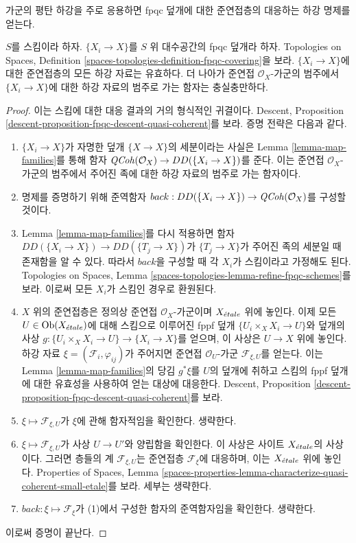 \noindent
가군의 평탄 하강을 주로 응용하면 fpqc 덮개에 대한 준연접층의 대응하는
하강 명제를 얻는다.

\begin{proposition}
\label{proposition-fpqc-descent-quasi-coherent}
$S$를 스킴이라 하자. $\{X_i\to X\}$를 $S$ 위 대수공간의 fpqc 덮개라
하자. Topologies on Spaces, Definition
\ref{spaces-topologies-definition-fpqc-covering}을 보라.
$\{X_i\to X\}$에 대한 준연접층의 모든 하강 자료는 유효하다. 더 나아가
준연접 $\mathcal{O}_X$-가군의 범주에서 $\{X_i\to X\}$에 대한 하강
자료의 범주로 가는 함자는 충실충만하다.
\end{proposition}

\begin{proof}
이는 스킴에 대한 대응 결과의 거의 형식적인 귀결이다. Descent,
Proposition \ref{descent-proposition-fpqc-descent-quasi-coherent}를 보라.
증명 전략은 다음과 같다.
\begin{enumerate}
\item $\{X_i\to X\}$가 자명한 덮개 $\{X\to X\}$의 세분이라는 사실은
Lemma \ref{lemma-map-families}를 통해 함자
$\mathit{QCoh}(\mathcal{O}_X)\to DD(\{X_i\to X\})$를 준다. 이는 준연접
$\mathcal{O}_X$-가군의 범주에서 주어진 족에 대한 하강 자료의 범주로 가는
함자이다.
\item 명제를 증명하기 위해 준역함자
$back:DD(\{X_i\to X\})\to\mathit{QCoh}(\mathcal{O}_X)$를 구성할 것이다.
\item Lemma \ref{lemma-map-families}를 다시 적용하면 함자
$DD(\{X_i\to X\})\to DD(\{T_j\to X\})$가 $\{T_j\to X\}$가
주어진 족의 세분일 때 존재함을 알 수 있다. 따라서
$back$을 구성할 때 각 $X_i$가 스킴이라고 가정해도 된다. Topologies on
Spaces, Lemma \ref{spaces-topologies-lemma-refine-fpqc-schemes}를 보라.
이로써 모든 $X_i$가 스킴인 경우로 환원된다.
\item $X$ 위의 준연접층은 정의상 준연접 $\mathcal{O}_X$-가군이며
$X_{\acute{e}tale}$ 위에 놓인다. 이제 모든 $U\in\mathop{\mathrm{Ob}}\nolimits(X_{\acute{e}tale})$에 대해 스킴으로
이루어진 fppf 덮개 $\{U_i\times_XX_i\to U\}$와 덮개의 사상
$g:\{U_i\times_XX_i\to U\}\to\{X_i\to X\}$를 얻으며, 이 사상은
$U\to X$ 위에 놓인다.
하강 자료 $\xi=(\mathcal{F}_i,\varphi_{ij})$가 주어지면 준연접
$\mathcal{O}_U$-가군 $\mathcal{F}_{\xi,U}$를 얻는다. 이는 Lemma
\ref{lemma-map-families}의 당김 $g^*\xi$를 $U$의 덮개에 취하고 스킴의
fppf 덮개에 대한 유효성을 사용하여 얻는 대상에 대응한다. Descent,
Proposition \ref{descent-proposition-fpqc-descent-quasi-coherent}를 보라.
\item $\xi\mapsto\mathcal{F}_{\xi,U}$가 $\xi$에 관해 함자적임을 확인한다.
생략한다.
\item $\xi\mapsto\mathcal{F}_{\xi,U}$가 사상 $U\to U'$와 양립함을
확인한다. 이 사상은 사이트 $X_{\acute{e}tale}$의 사상이다. 그러면 층들의 계
$\mathcal{F}_{\xi,U}$는 준연접층 $\mathcal{F}_\xi$에 대응하며, 이는
$X_{\acute{e}tale}$ 위에 놓인다. Properties of Spaces, Lemma
\ref{spaces-properties-lemma-characterize-quasi-coherent-small-etale}를 보라.
세부는 생략한다.
\item $back:\xi\mapsto\mathcal{F}_\xi$가 (1)에서 구성한 함자의
준역함자임을 확인한다. 생략한다.
\end{enumerate}
이로써 증명이 끝난다.
\end{proof}

